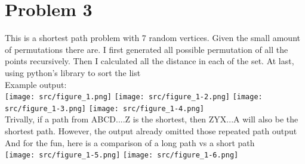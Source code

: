 \documentclass[a4paper]{article}
\begin{document}
    \section{Problem 3}
    This is a shortest path problem with 7 random vertices. Given the small amount of permutations there are. I first generated all possible permutation of all the points recursively. Then I calculated all the distance in each of the set. At last, using python's library to sort the list
    \\Example output: \\
    \texttt{[image: src/figure\_1.png]}
    \texttt{[image: src/figure\_1-2.png]}
    \texttt{[image: src/figure\_1-3.png]}
    \texttt{[image: src/figure\_1-4.png]}
    \\Trivally, if a path from ABCD....Z is the shortest, then ZYX...A will also be the shortest path. However, the output already omitted those repeated path output
    \\And for the fun, here is a comparison of a long path vs a short path\\
    \texttt{[image: src/figure\_1-5.png]}
    \texttt{[image: src/figure\_1-6.png]}
    
\end{document}
